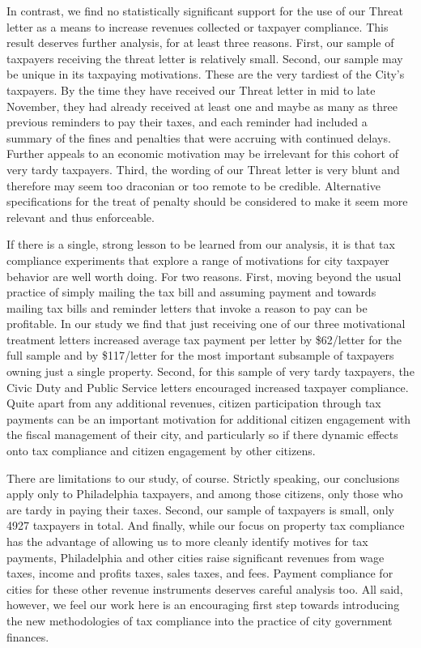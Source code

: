 \documentclass[12pt,titlepage]{article}
\begin{document}
In contrast, we find no statistically significant support for the use
of our Threat letter as a means to increase revenues collected or
taxpayer compliance.  This result deserves further analysis, for at
least three reasons.  First, our sample of taxpayers receiving the
threat letter is relatively small.  Second, our sample may be unique
in its taxpaying motivations.  These are the very tardiest of the
City's taxpayers.  By the time they have received our Threat letter in
mid to late November, they had already received at least one and maybe
as many as three previous reminders to pay their taxes, and each
reminder had included a summary of the fines and penalties that were
accruing with continued delays.  Further appeals to an economic
motivation may be irrelevant for this cohort of very tardy taxpayers.
Third, the wording of our Threat letter is very blunt and therefore
may seem too draconian or too remote to be credible.  Alternative
specifications for the treat of penalty should be considered to make
it seem more relevant and thus enforceable.
	
If there is a single, strong lesson to be learned from our analysis,
it is that tax compliance experiments that explore a range of
motivations for city taxpayer behavior are well worth doing.  For two
reasons.  First, moving beyond the usual practice of simply mailing
the tax bill and assuming payment and towards mailing tax bills and
reminder letters that invoke a reason to pay can be profitable.  In
our study we find that just receiving one of our three motivational
treatment letters increased average tax payment per letter by
\$62/letter for the full sample and by \$117/letter for the most
important subsample of taxpayers owning just a single property.
Second, for this sample of very tardy taxpayers, the Civic Duty and
Public Service letters encouraged increased taxpayer compliance.
Quite apart from any additional revenues, citizen participation
through tax payments can be an important motivation for additional
citizen engagement with the fiscal management of their city, and
particularly so if there dynamic effects onto tax compliance and
citizen engagement by other citizens.

There are limitations to our study, of course.  Strictly speaking, our
conclusions apply only to Philadelphia taxpayers, and among those
citizens, only those who are tardy in paying their taxes. Second, our
sample of taxpayers is small, only 4927 taxpayers in total.  And
finally, while our focus on property tax compliance has the advantage
of allowing us to more cleanly identify motives for tax payments,
Philadelphia and other cities raise significant revenues from wage
taxes, income and profits taxes, sales taxes, and fees.  Payment
compliance for cities for these other revenue instruments deserves
careful analysis too.  All said, however, we feel our work here is an
encouraging first step towards introducing the new methodologies of
tax compliance into the practice of city government finances.
\end{document}
